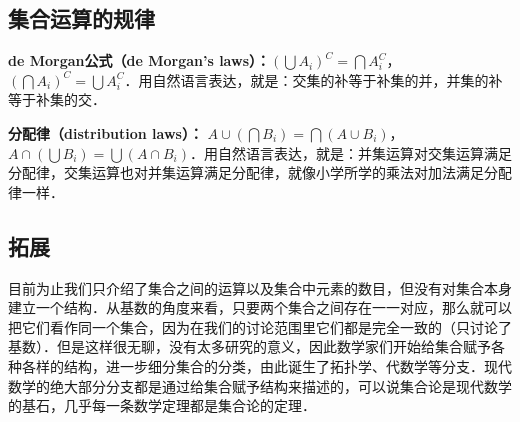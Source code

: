 \subsection{集合运算的规律}

\textbf{de Morgan公式（de Morgan's laws）：}$(\bigcup A_i)^C=\bigcap A_i^C$，$(\bigcap A_i)^C=\bigcup A_i^C$．用自然语言表达，就是：交集的补等于补集的并，并集的补等于补集的交．

\textbf{分配律（distribution laws）：} $A\cup(\bigcap B_i)=\bigcap (A\cup B_i)$，$A\cap(\bigcup B_i)=\bigcup (A\cap B_i)$．用自然语言表达，就是：并集运算对交集运算满足分配律，交集运算也对并集运算满足分配律，就像小学所学的乘法对加法满足分配律一样．

\subsection{拓展}
目前为止我们只介绍了集合之间的运算以及集合中元素的数目，但没有对集合本身建立一个结构．从基数的角度来看，只要两个集合之间存在一一对应，那么就可以把它们看作同一个集合，因为在我们的讨论范围里它们都是完全一致的（只讨论了基数）．但是这样很无聊，没有太多研究的意义，因此数学家们开始给集合赋予各种各样的结构，进一步细分集合的分类，由此诞生了拓扑学、代数学等分支．现代数学的绝大部分分支都是通过给集合赋予结构来描述的，可以说集合论是现代数学的基石，几乎每一条数学定理都是集合论的定理．
